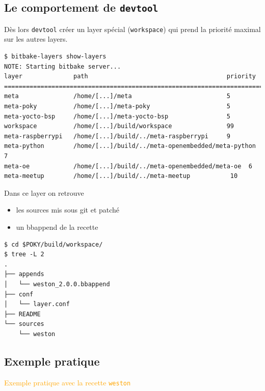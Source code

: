 \documentclass[compress]{beamer}
\begin{document}
\subsection{Le comportement de \texttt{devtool}}

\begin{frame}[fragile]
Dès lors \texttt{devtool} créer un layer spécial (\texttt{workspace}) qui prend la priorité maximal sur les autres layers.
\begin{lstlisting}[style=shell,breaklines=false,xleftmargin=-16px,xrightmargin=-16px]
$ bitbake-layers show-layers
NOTE: Starting bitbake server...
layer              path                                      priority
=========================================================================
meta               /home/[...]/meta                          5
meta-poky          /home/[...]/meta-poky                     5
meta-yocto-bsp     /home/[...]/meta-yocto-bsp                5
workspace          /home/[...]/build/workspace               99
meta-raspberrypi   /home/[...]/build/../meta-raspberrypi     9
meta-python        /home/[...]/build/../meta-openembedded/meta-python  7
meta-oe            /home/[...]/build/../meta-openembedded/meta-oe  6
meta-meetup        /home/[...]/build/../meta-meetup           10
\end{lstlisting}
\end{frame}

\begin{frame}[fragile]
Dans ce layer on retrouve
\begin{itemize}
	\item les sources mis sous git et patché
	\item un bbappend de la recette
\end{itemize}
\begin{lstlisting}[style=shell]
$ cd $POKY/build/workspace/
$ tree -L 2 
.
├── appends
│   └── weston_2.0.0.bbappend
├── conf
│   └── layer.conf
├── README
└── sources
    └── weston
\end{lstlisting}
\end{frame}

\subsection{Exemple pratique}

\begin{frame}
\begin{center}
\textcolor{orange}{\huge{Exemple pratique avec la recette \texttt{weston}}}
\end{center}
\end{frame}
\end{document}
